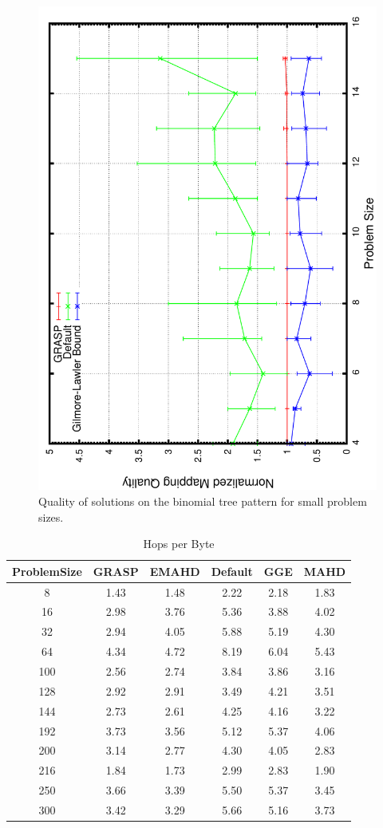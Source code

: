 \documentclass[12pt]{article}
\begin{document}
\begin{figure}[!ht]
	\centering
	 \includegraphics[width=0.7\linewidth, angle=270]{binomialfinalexactA} 
  \caption{Quality of solutions on the binomial tree pattern for small problem sizes.}
  \label{fig:bt-small}
\end{figure}
%

\begin{table}[ht]
\caption{Hops per Byte} %
\centering %
\begin{tabular}{c c c c c c} %
\hline %
ProblemSize & GRASP & EMAHD & Default & GGE & MAHD\\  %
\hline %
8	& 1.43	& 1.48	& 2.22	& 2.18	& 1.83\\
16	& 2.98 &	3.76 &	5.36	& 3.88	& 4.02\\ 
32	& 2.94	& 4.05	& 5.88	& 5.19	& 4.30 \\ 
64	& 4.34	& 4.72	& 8.19	& 6.04	& 5.43 \\
100	& 2.56	& 2.74	& 3.84	& 3.86	& 3.16 \\
128	& 2.92	& 2.91	& 3.49	& 4.21	& 3.51 \\
144	& 2.73	& 2.61	& 4.25	& 4.16	& 3.22 \\
192	& 3.73	& 3.56	& 5.12	& 5.37	& 4.06 \\
200	& 3.14	& 2.77	& 4.30	& 4.05	& 2.83 \\
216	& 1.84	& 1.73	& 2.99	& 2.83	& 1.90 \\
250	& 3.66	& 3.39	& 5.50	& 5.37	& 3.45 \\
300	& 3.42	& 3.29	& 5.66	& 5.16	& 3.73 \\ [1ex] %
\hline %
\end{tabular}
\label{table:nonlin} %
\end{table}
\end{document}
